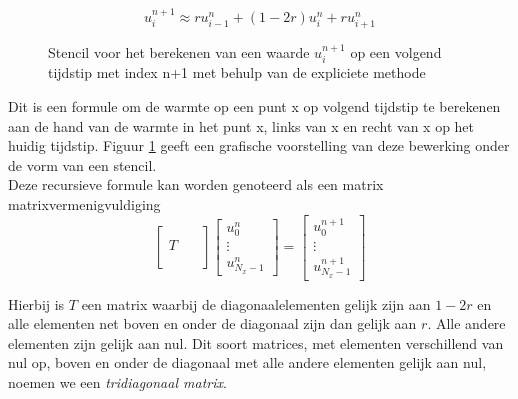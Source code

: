 \documentclass[a4paper,kulak]{kulakarticle} %
\newcommand{\stencilpt}[4][]{\node[circle,fill,draw,inner sep=1.5pt,label={above left:#4},#1] at (#2) (#3) {}}
\begin{document}
\begin{equation}
	u_i^{n+1} \approx r u_{i-1}^n + \left( 1 - 2r \right) u_i^n + r u_{i+1}^n 
	\label{eq:expl_recursive}
\end{equation}

\begin{figure}
\centering
{}
\label{fig:stencil_explicit}
\caption{Stencil voor het berekenen van een waarde $u_i^{n+1}$ op een volgend tijdstip met index n+1 met behulp van de expliciete methode}
\end{figure}

Dit is een formule om de warmte op een punt x op volgend tijdstip te berekenen aan de hand van de warmte in het punt x, links van x en recht van x op het huidig tijdstip. Figuur \ref{fig:stencil_explicit} geeft een grafische voorstelling van deze bewerking onder de vorm van een stencil. \\
Deze recursieve formule kan worden genoteerd als een matrix matrixvermenigvuldiging
\begin{equation}
	\begin{bmatrix}
		\qquad \\
		T \\
		\\ 
	\end{bmatrix}
	\begin{bmatrix}
		u_0^n \\
		\vdots \\
		u_{N_x - 1}^n
	\end{bmatrix}
	=
	\begin{bmatrix}
		u_0^{n+1} \\
		\vdots \\
		u_{N_x - 1}^{n+1}
	\end{bmatrix}	
\end{equation}

Hierbij is $T$ een matrix waarbij de diagonaalelementen gelijk zijn aan $1-2r$ en alle elementen net boven en onder de diagonaal zijn dan gelijk aan $r$. Alle andere elementen zijn gelijk aan nul. Dit soort matrices, met elementen verschillend van nul op, boven en onder de diagonaal met alle andere elementen gelijk aan nul, noemen we een \textit{tridiagonaal matrix}.
\end{document}
